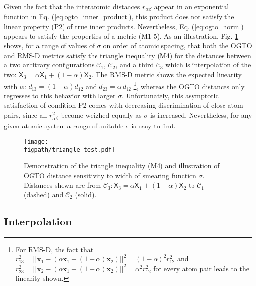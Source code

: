 \documentclass[journal=jctcce,manuscript=article]{achemso}
\newlength{\figwidth}
\newcommand{\figpath}{Figures}
\newcommand{\eref}[1]{{Eq. (\ref{#1})}}
\newcommand{\fref}[1]{{Fig. \ref{#1}}}
\newcommand{\neighborhood}{\mathcal{C}}
\newcommand{\xb}{\mathbf{x}}
\newcommand{\Xs}{\mathsf{X}}
\begin{document}
Given the fact that the interatomic distances $r_{\alpha\beta}$ appear in an exponential function in \eref{eq:ogto_inner_product}, this product does not satisfy the linear property (P2) of true inner products. 
Nevertheless, \eref{eq:ogto_norm} appears to satisfy the properties of a metric (M1-5).
As an illustration, \fref{fig:soap} shows, for a range of values of $\sigma$ on order of atomic spacing, that both the OGTO and RMS-D metrics satisfy the triangle inequality (M4) for the distances between a two arbitrary configurations $\neighborhood_1$, $\neighborhood_2$,  and a third $\neighborhood_3$ which is interpolation of the two: $\Xs_3 = \alpha \Xs_1 + (1-\alpha) \Xs_2$.
The RMS-D metric shows the expected linearity with $\alpha$: $d_{13} = (1-\alpha) d_{12}$ and $d_{23} = \alpha \, d_{12}$
\footnote{ For RMS-D, the fact that $r^2_{13} = || \xb_1 - (\alpha \xb_1 + (1-\alpha) \xb_2) ||^2  = (1-\alpha)^2 r^2_{12}$ and $r^2_{23} = || \xb_2 - (\alpha \xb_1 + (1-\alpha) \xb_2) ||^2  = \alpha^2 r^2_{12}$ for every atom pair leads to the linearity shown.  },
 whereas the OGTO distances only regresses to this behavior with larger $\sigma$.
Unfortunately, this asymptotic satisfaction of condition P2 comes with decreasing discrimination of close atom pairs, since all $r^2_{\alpha\beta}$ become weighed equally as $\sigma$ is increased. 
Nevertheless, for any given atomic system a range of suitable $\sigma$ is easy to find.

\begin{figure}[h]
{\texttt{[image: \\figpath/triangle\_test.pdf]}}
\caption{Demonstration of the triangle inequality (M4) and illustration of OGTO distance sensitivity to width of smearing function $\sigma$.
Distances shown are from $\neighborhood_3: \Xs_3 = \alpha \Xs_1 + (1-\alpha) \Xs_2$ to $\neighborhood_1$ (dashed) and $\neighborhood_2$ (solid).
} \label{fig:soap}
\end{figure}

\subsection{Interpolation} \label{sec:interpolation}
\end{document}
